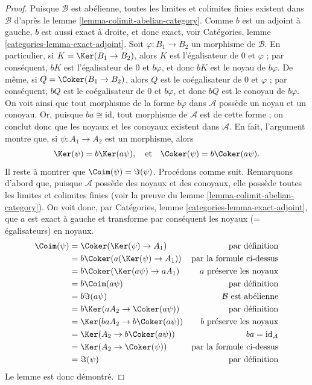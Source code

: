 \begin{proof}
Puisque $\mathcal{B}$ est abélienne, toutes les limites et colimites finies
existent dans $\mathcal{B}$ d'après le lemme \ref{lemma-colimit-abelian-category}.
Comme $b$ est un adjoint à gauche, $b$ est aussi exact à droite,
et donc exact, voir
Catégories, lemme \ref{categories-lemma-exact-adjoint}.
Soit $\varphi : B_1 \to B_2$ un morphisme de $\mathcal{B}$.
En particulier, si $K = \Ker(B_1 \to B_2)$, alors $K$ est
l'égalisateur de $0$ et $\varphi$ ; par conséquent,
$bK$ est l'égalisateur de $0$ et $b\varphi$, et donc
$bK$ est le noyau de $b\varphi$. De même, si
$Q = \Coker(B_1 \to B_2)$, alors $Q$ est
le coégalisateur de $0$ et $\varphi$ ; par conséquent,
$bQ$ est le coégalisateur de $0$ et $b\varphi$, et donc
$bQ$ est le conoyau de $b\varphi$. On voit ainsi que tout morphisme
de la forme $b\varphi$ dans $\mathcal{A}$ possède un noyau et un conoyau.
Or, puisque $ba \cong \text{id}$, tout morphisme de
$\mathcal{A}$ est de cette forme ; on conclut donc que les noyaux et
les conoyaux existent dans $\mathcal{A}$. En fait, l'argument montre que,
si $\psi : A_1 \to A_2$ est un morphisme, alors
$$
\Ker(\psi) = b\Ker(a\psi),
\quad\text{et}\quad
\Coker(\psi) = b\Coker(a\psi).
$$
Il reste à montrer que $\Coim(\psi)= \Im(\psi)$.
Procédons comme suit.
Remarquons d'abord que, puisque $\mathcal{A}$ possède des noyaux et des conoyaux, elle
possède toutes les limites et colimites finies (voir la preuve du
lemme \ref{lemma-colimit-abelian-category}).
On voit donc, par Catégories, lemme \ref{categories-lemma-exact-adjoint},
que $a$ est exact à gauche et
transforme par conséquent les noyaux (= égalisateurs) en noyaux.
\begin{align*}
\Coim(\psi)
& =
\Coker(\Ker(\psi) \to A_1)
& \text{par définition} \\
& =
b\Coker(a(\Ker(\psi) \to A_1))
& \text{par la formule ci-dessus} \\
& =
b\Coker(\Ker(a\psi) \to aA_1)
& a\text{ préserve les noyaux} \\
& =
b\Coim(a\psi)
& \text{par définition} \\
& =
b\Im(a\psi)
& \mathcal{B}\text{ est abélienne} \\
& =
b\Ker(aA_2 \to \Coker(a\psi))
& \text{par définition} \\
& =
\Ker(baA_2 \to b\Coker(a\psi))
& b\text{ préserve les noyaux} \\
& =
\Ker(A_2 \to b\Coker(a\psi))
& ba = \text{id}_\mathcal{A} \\
& =
\Ker(A_2 \to \Coker(\psi))
& \text{par la formule ci-dessus} \\
& =
\Im(\psi)
& \text{par définition}
\end{align*}
Le lemme est donc démontré.
\end{proof}





